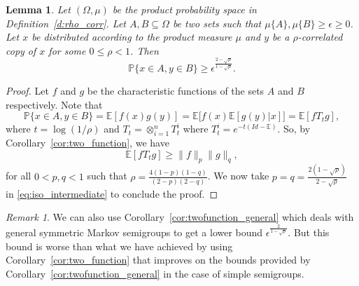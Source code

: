 \documentclass[11pt]{amsart}
\newcommand{\E}{\mathbb{E}}
\newcommand{\PP}{\mathbb{P}}
\newcommand{\eps}{\epsilon}
\newcommand{\1}{\mathbf{1}}
\def\E{{\mathbb E}}
\theoremstyle{definition}
\theoremstyle{plain}
\newtheorem{lemma}[example]{Lemma}
\theoremstyle{remark}
\newtheorem{remark}[example]{Remark}
\numberwithin{equation}{section}
\begin{document}
\begin{lemma}\label{l:correlated_sets_noise}
Let $(\Omega, \mu)$ be the product probability space in Definition~\ref{d:rho_corr}. Let $A, B \subseteq \Omega$ be two sets such that
$\mu\{A\}, \mu\{B\} \ge \eps \ge 0$. 
Let $x$ be distributed according to the product measure $\mu$ and $y$ be a $\rho$-correlated copy of $x$ for some $ 0 \le \rho < 1$. Then
\begin{equation} \label{ineq:corr}
\PP\{ x \in A, y \in B\} \ge \eps^{\frac{2- \sqrt{\rho}}{1 - \sqrt{\rho}}}.
\end{equation}
\end{lemma}

\begin{proof}
Let $f$ and $g$ be the characteristic functions of the sets $A$ and $B$ respectively. Note that
\[ \PP\{ x \in A, y \in B\} = \E [f(x) g(y)]  = \E \big[ f(x) \E [g(y)| x] \big]=   \E[ f T_t g ],\]
where $t=\log(1/\rho)$ and $T_t = \otimes_{i=1}^n T^i_t$ where $T^i_t = e^{-t(Id-\E)}$.
So, by Corollary~\ref{cor:two_function}, we have
\begin{equation} \E[ f T_t g ] \ge \|f \|_p \|g\|_q, \label{eq:iso_intermediate}
\end{equation}
for all $0 < p, q<1$ such that $ \rho = \frac{4(1- p)(1-q)}{(2-p)(2-q)}$. We now take $p = q = \frac{2(1-\sqrt{\rho})}{2 - \sqrt{\rho}}$ in \eqref{eq:iso_intermediate} to conclude the proof.
\end{proof}

\begin{remark}
We can also use Corollary~\ref{cor:twofunction_general} which deals with general symmetric Markov semigroups  to get a lower bound $\eps^{  \frac{2}{1 - \sqrt{\rho}}}$. But this bound is worse than what we have achieved by using Corollary~\ref{cor:two_function} that improves on the bounds provided by Corollary~\ref{cor:twofunction_general} in the case of simple semigroups.
\end{remark}
\end{document}
